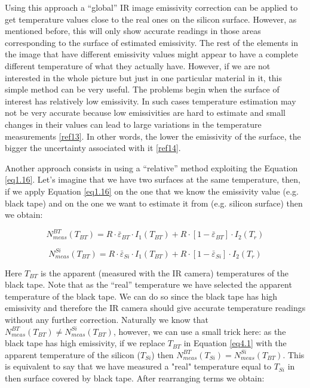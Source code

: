 		Using this approach a “global” IR image emissivity correction can be applied to get temperature values close to the real ones on the silicon surface. However, as mentioned before, this will only show accurate readings in those areas corresponding to the surface of estimated emissivity. The rest of the elements in the image that have different emissivity values might appear to have a complete different temperature of what they actually have. However, if we are not interested in the whole picture but just in one particular material in it, this simple method can be very useful. The problems begin when the surface of interest has relatively low emissivity. In such cases temperature estimation may not be very accurate because low emissivities are hard to estimate and small changes in their values can lead to large variations in the temperature measurements \ref{ref13}. In other words, the lower the emissivity of the surface, the bigger the uncertainty associated with it \ref{ref14}.
		
		Another approach consists in using a “relative” method exploiting the Equation \ref{eq1.16}. Let's imagine that we have two surfaces at the same temperature, then, if we apply Equation \ref{eq1.16} on the one that we know the emissivity value (e.g. black tape) and on the one we want to estimate it from (e.g. silicon surface) then we obtain:
		
		\begin{equation}\label{eq4.1}
		N^{BT}_{meas}(T_{BT})= R \cdot \bar{\varepsilon}_{BT} \cdot I_{1}(T_{BT}) + R \cdot [1- \bar{\varepsilon}_{BT}] \cdot I_{2}(T_{r})
		\end{equation}
		
		\begin{equation}\label{eq4.2}
		N^{Si}_{meas}(T_{BT})= R \cdot \bar{\varepsilon}_{Si} \cdot I_{1}(T_{BT}) + R \cdot [1- \bar{\varepsilon}_{Si}] \cdot I_{2}(T_{r})
		\end{equation}\bigskip
		
		Here $T_{BT}$ is the apparent (measured with the IR camera) temperatures of the black tape. Note that as the “real” temperature we have selected the apparent temperature of the black tape. We can do so since the black tape has high emissivity and therefore the IR camera should give accurate temperature readings without any further correction. Naturally we know that $N^{BT}_{meas}(T_{BT}) \neq N^{Si}_{meas}(T_{BT})$, however, we can use a small trick here: as the black tape has high emissivity, if we replace $T_{BT}$ in Equation \ref{eq4.1} with the apparent temperature of the silicon ($T_{Si}$) then $N^{BT}_{meas}(T_{Si}) = N^{Si}_{meas}(T_{BT})$. This is equivalent to say that we have measured a "real" temperature equal to $T_{Si}$ in then surface covered by black tape. After rearranging terms we obtain:
		
